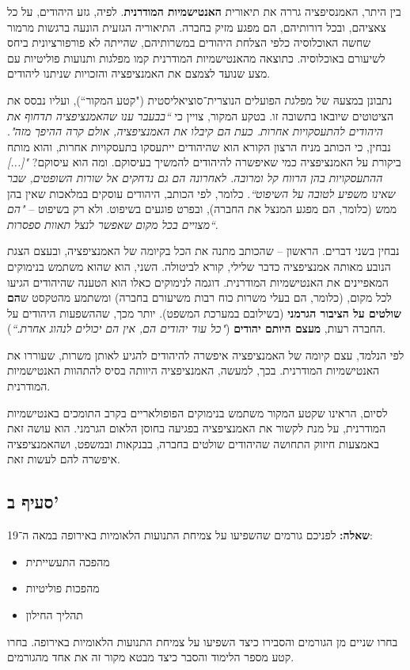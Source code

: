 \documentclass[]{article}
\newcommand\bs    {\blacksquare}
\begin{document}
		בין היתר, האמנסיפציה גררה את תיאורית \textbf{האנטישמיות המודרנית}. לפיה, גזע היהודים, על כל צאציהם, ובכל דורותיהם, הם מפגע מזיק בחברה. התיאוריה הגזעית הונעה ברגשות מרמור שחשה האוכלוסיה כלפי הצלחת היהודים במשרותיהם, שהייתה לא פורפורציונית ביחס לשיעורם באוכלוסיה. כתוצאה מהאנטישמיות המודרנית קמו מפלגות ותנועות פוליטיות עם מצע שנועד לצמצם את האמנציפציה והזכויות שניתנו ליהודים. 
		
		נתבונן במצעהּ של מפלגת הפועלים הנוצרית־סוציאליסטית ("קטע המקור``), ועליו נבסס את הציטוטים שיובאו בתשובה זו. בטקע המקור, צויין כי \textit{``בבעבר ענו שהאמנציפציה תדחוף את היהודים להתעסקויות אחרות. כעת הם קיבלו את האמנציפציה, אולם קרה ההיפך מזה"}. נבחין, כי הכותב מניח הרצון הקורא הוא שהיהודים ייתעסקו בתעסקויות אחרות, והוא מותח ביקורת על האמנציפציה כמי שאיפשרה להיהודים להמשיך בעיסוקם. ומה הוא עיסוקם? \textit{"[...] ההתעסקויות בהן הרווח קל ומרובה. לאחרונה הם גם נדחקים אל שורות השופטים, שבר שאינו משפיע לטובה על השיפוט``}. כלומר, לפי הכותב, היהודים עוסקים במלאכות שאין בהן ממש (כלומר, הם מפגע המנצל את החברה), ובפרט פוגעים בשיפוט. ולא רק בשיפוט – \textit{"הם מצויים בכל מקום שאפשר לנצל תאוות ספסרות``}. 
		
		נבחין בשני דברים. הראשון – שהכותב מתנה את הכל בקיומה של האמנציפציה, ובעצם הצגת הנובע מאותה אמנציפציה כדבר שלילי, קורא לביטולה. השני, הוא שהוא משתמש בנימוקים המאפיינים את האנטישמיות המודרנית. דוגמה לנימוקים כאלו הוא הטענה שהיהודים הגיעו לכל מקום, (כלומר, הם בעלי משרות כוח רבות משיעורם בחברה) ומשתמע מהטקסט ש\textbf{הם שולטים על הציבור הגרמני} (בשילובם במערכת המשפט). יותר מכך, שההשפעות היהודים על החברה רעות, \textbf{מעצם היותם יהודים} (\textit{"כל עוד יהודים הם, אין הם יכולים לנהוג אחרת.``}).
		
		לפי הנלמד, עצם קיומה של האמנציפציה איפשרה להיהודים להגיע לאותן משרות, שעוררו את האנטישמיות המודרנית. בכך, למעשה, האמנציפציה היוותה בסיס להתהוות האנטישמיות המודרנית. 
		
		לסיום, הראינו שקטע המקור משתמש בנימוקים הפופולאריים בקרב התומכים באנטישמיות המודרנית, על מנת לקשור את האמנציפציה בפגיעה בחוסן הלאום הגרמני. הוא עושה זאת באמצעות חיזוק התחושה שהיהודים שולטים בחברה, בבנקאות ובמשפט, ושהאמנציפציה איפשרה להם לעשות זאת. \hfill \bs
		
	\subsection*{סעיף ב'}
		\textbf{שאלה: }לפניכם גורמים שהשפיעו על צמיחת התנועות הלאומיות באירופה במאה ה־19: 
		\begin{itemize}
			\item מהפכה התעשייתית
			\item מהפכות פוליטיות
			\item תהליך החילון
		\end{itemize}
		בחרו שניים מן הגורמים והסבירו כיצד השפיעו על צמיחת התנועות הלאומיות באירופה. בחרו קטע מספר הלימוד והסבר כיצד מבטא מקור זה את אחד מהגורמים. 
		
\end{document}
